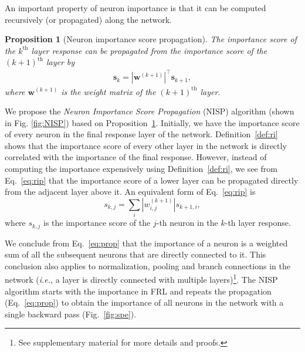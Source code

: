 \documentclass[10pt,twocolumn,letterpaper]{article}
\newtheorem{proposition}[theorem]{Proposition}
\def\mb{\mathbf}
\def\ie{\emph{i.e.}}
\begin{document}
An important property of neuron importance is that it can be computed recursively (or propagated) along the network.
\begin{proposition}[Neuron importance score propagation] \label{def:rip} The importance score of the $k^\text{th}$ layer response can be propagated from the importance score of the $(k+1)^\text{th}$ layer by
\begin{align}
\mb s_k=|\mb w^{(k+1)}|^\intercal\mb s_{k+1},\label{eq:rip}
\end{align}
where $\mb w^{(k+1)}$ is the weight matrix of the $(k+1)^\text{th}$ layer.
\end{proposition}%
We propose the \textit{Neuron Importance Score Propagation} (NISP) algorithm (shown in Fig. \ref{fig:NISP}) based on Proposition~\ref{def:rip}. Initially, we have the importance score of every neuron in the final response layer of the network. Definition~\ref{def:ri} shows that the importance score of every other layer in the network is directly correlated with the importance of the final response. However, instead of computing the importance expensively using Definition~\ref{def:ri}, we see from Eq.~\ref{eq:rip} that the importance score of a lower layer can be propagated directly from the adjacent layer above it. An equivalent form of Eq.~\ref{eq:rip} is
\begin{equation}
    \textstyle s_{k,j}=\sum_i |w^{(k+1)}_{i,j}|s_{k+1,i},\label{eq:prop}
\end{equation}
where $s_{k,j}$ is the importance score of the $j$-th neuron in the $k$-th layer response. 

We conclude from Eq.~\ref{eq:prop} that the importance of a neuron is a weighted sum of all the subsequent neurons that are directly connected to it. This conclusion also applies to normalization, pooling and branch connections in the network (\ie, a layer is directly connected with multiple layers)\footnote{\label{supp}See supplementary material for more details and proofs.}. The NISP algorithm starts with the importance in FRL and repeats the propagation (Eq.~\ref{eq:prop}) to obtain the importance of all neurons in the network with a single backward pass (Fig.~\ref{fig:spe}).
\end{document}
